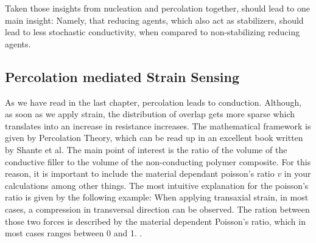 Taken those insights from nucleation and percolation together, should lead to one main insight: Namely, that reducing agents, which also act as stabilizers, should lead to less stochastic conductivity, when compared to non-stabilizing reducing agents.

\subsection{Percolation mediated Strain Sensing}

As we have read in the last chapter, percolation leads to conduction. Although, as soon as we apply strain, the distribution of overlap gets more sparse which translates into an increase in resistance increases. The mathematical framework is given by Percolation Theory, which can be read up in an excellent book written by Shante et al.\cite{Shante} The main point of interest is the ratio of the volume of the conductive filler to the volume of the non-conducting polymer composite. For this reason, it is important to include the material dependant poisson's ratio $v$ in your calculations among other things. The most intuitive explanation for the poisson's ratio is given by the following example: When applying transaxial strain, in most cases, a compression in transversal direction can be observed. The ration between those two forces is described by the material dependent Poisson's ratio, which in most cases ranges between 0 and 1. \cite{Gercek}. 